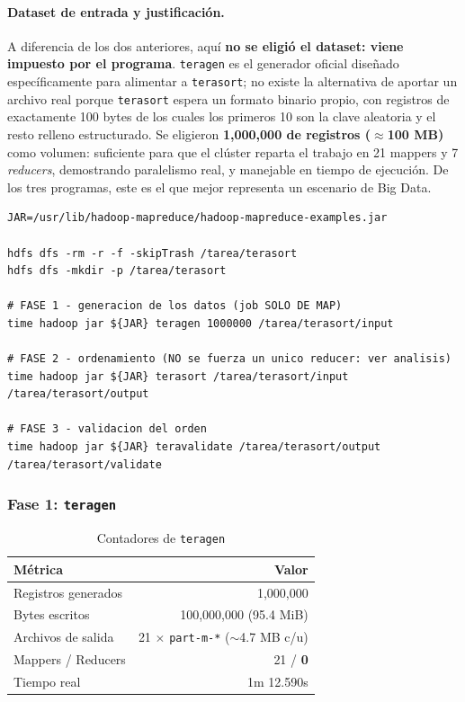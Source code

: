 \paragraph{Dataset de entrada y justificación.} A diferencia de los dos anteriores, aquí \textbf{no se eligió el dataset: viene impuesto por el programa}. \texttt{teragen} es el generador oficial diseñado específicamente para alimentar a \texttt{terasort}; no existe la alternativa de aportar un archivo real porque \texttt{terasort} espera un formato binario propio, con registros de exactamente 100 bytes de los cuales los primeros 10 son la clave aleatoria y el resto relleno estructurado. Se eligieron \textbf{1,000,000 de registros ($\approx$100 MB)} como volumen: suficiente para que el clúster reparta el trabajo en 21 mappers y 7 \textit{reducers}, demostrando paralelismo real, y manejable en tiempo de ejecución. De los tres programas, este es el que mejor representa un escenario de Big Data.

\begin{lstlisting}[style=sh]
JAR=/usr/lib/hadoop-mapreduce/hadoop-mapreduce-examples.jar

hdfs dfs -rm -r -f -skipTrash /tarea/terasort
hdfs dfs -mkdir -p /tarea/terasort

# FASE 1 - generacion de los datos (job SOLO DE MAP)
time hadoop jar ${JAR} teragen 1000000 /tarea/terasort/input

# FASE 2 - ordenamiento (NO se fuerza un unico reducer: ver analisis)
time hadoop jar ${JAR} terasort /tarea/terasort/input /tarea/terasort/output

# FASE 3 - validacion del orden
time hadoop jar ${JAR} teravalidate /tarea/terasort/output /tarea/terasort/validate
\end{lstlisting}

\subsubsection{Fase 1: \texttt{teragen}}

\begin{table}[H]
\centering
\caption{Contadores de \texttt{teragen}}
\label{tab:teragen}
\vspace{0.2cm}
\small
\begin{tabular}{@{}lr@{}}
\toprule
\textbf{Métrica} & \textbf{Valor} \\
\midrule
Registros generados      & 1,000,000 \\
Bytes escritos           & 100,000,000 (95.4 MiB) \\
Archivos de salida       & 21 $\times$ \texttt{part-m-*} ($\sim$4.7 MB c/u) \\
Mappers / Reducers       & 21 / \textbf{0} \\
Tiempo real              & 1m 12.590s \\
\bottomrule
\end{tabular}
\end{table}

